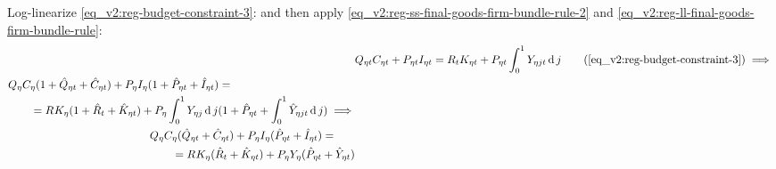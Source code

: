 \documentclass[../thesis.tex]{subfiles}
\begin{document}
Log-linearize \ref{eq_v2:reg-budget-constraint-3}: and then apply \ref{eq_v2:reg-ss-final-goods-firm-bundle-rule-2} and \ref{eq_v2:reg-ll-final-goods-firm-bundle-rule}:
\begin{align}
	& Q_{\eta t} C_{\eta t} + P_{\eta t} I_{\eta t} = R_{t} K_{\eta t} + P_{\eta t} \int_{0}^{1} Y_{\eta jt} \dif j \tag{\ref{eq_v2:reg-budget-constraint-3}} \implies \\
	\begin{split}
	& Q_{\eta} C_{\eta} (1 + \hat{Q}_{\eta t} + \hat{C}_{\eta t}) + P_{\eta} I_{\eta} (1 + \hat{P}_{\eta t} + \hat{I}_{\eta t}) = \\
	& \qquad = R_{} K_{\eta} (1 + \hat{R}_{t} + \hat{K}_{\eta t}) + P_{\eta} \int_{0}^{1} Y_{\eta j} \dif j (1 + \hat{P}_{\eta t} + \int_{0}^{1} \hat{Y}_{\eta jt} \dif j) \implies	
	\end{split} \nonumber \\
	\begin{split}
		& Q_{\eta} C_{\eta} (\hat{Q}_{\eta t} + \hat{C}_{\eta t}) + P_{\eta} I_{\eta} (\hat{P}_{\eta t} + \hat{I}_{\eta t}) = \\
		& \qquad = R_{} K_{\eta} (\hat{R}_{t} + \hat{K}_{\eta t}) + P_{\eta} Y_{\eta} (\hat{P}_{\eta t} + \hat{Y}_{\eta t})
	\end{split} \label{eq_v2:reg-ll-budget-constraint-3}
\end{align}
\end{document}
